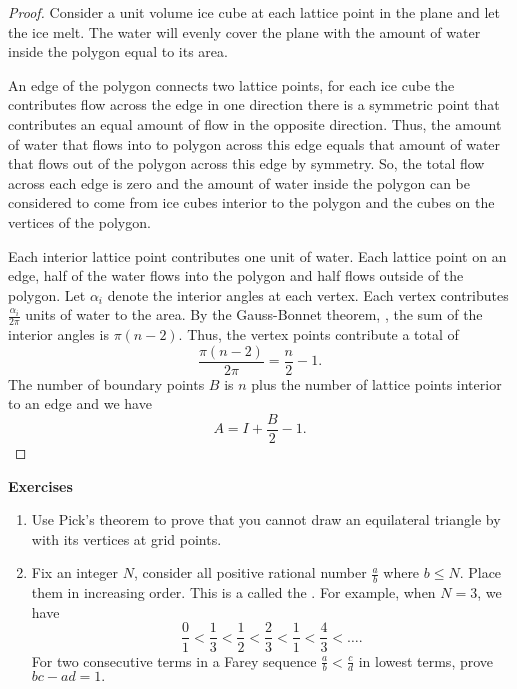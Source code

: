 \begin{proof}
	Consider a unit volume ice cube at each lattice point in the plane and let the ice melt.
	The water will evenly cover the plane with the amount of water inside the polygon 
	equal to its area.
	
	An edge of the polygon connects two lattice points,
	for each ice cube the contributes flow across the edge in one direction there is a symmetric
	point that contributes an equal amount of flow in the opposite direction. Thus, 
	the amount of water that flows
	into to polygon across this edge equals that amount of water that flows out of the polygon
	across this edge by symmetry.
	So, the total flow across each edge is zero and
	the amount of water inside the polygon can be considered to come from ice cubes interior to the polygon and the cubes on the vertices
	of the polygon.
	
	Each interior lattice point contributes one unit of water. 
	Each lattice point on an edge, half of the water flows into the polygon and
	half flows outside of the polygon.
	Let $\alpha_i$ denote the interior angles at each vertex.
	Each vertex contributes $\frac{\alpha_i}{2\pi}$ units of water to the area.
	By the Gauss-Bonnet theorem, , the sum of the interior
	angles is $\pi(n-2)$. Thus, the vertex points contribute a total of 
	$$\frac{\pi(n-2)}{2\pi}=\frac{n}{2}-1.$$
	The number of boundary points $B$ is $n$ plus the number of lattice points interior to an edge
	and we have
	$$A=I+\frac{B}{2}-1.$$
\end{proof}


\noindent \textbf{Exercises}


\begin{enumerate}
	\item Use Pick's theorem to prove that you cannot draw an equilateral triangle by with its vertices
	at grid points.
	
	\item Fix an integer $N$, consider all positive rational number $\frac{a}{b}$ where
	$b\leq N$. Place them in increasing order. This is a called the .
	For example, when $N=3$, we have
	$$\frac{0}{1}<\frac{1}{3}<\frac{1}{2}<\frac{2}{3}<\frac{1}{1}<\frac{4}{3}<\ldots.$$
	For two consecutive terms in a Farey sequence $\frac{a}{b}<\frac{c}{d}$ in lowest terms,
	prove $bc-ad=1.$
	
\end{enumerate}

\pagebreak
